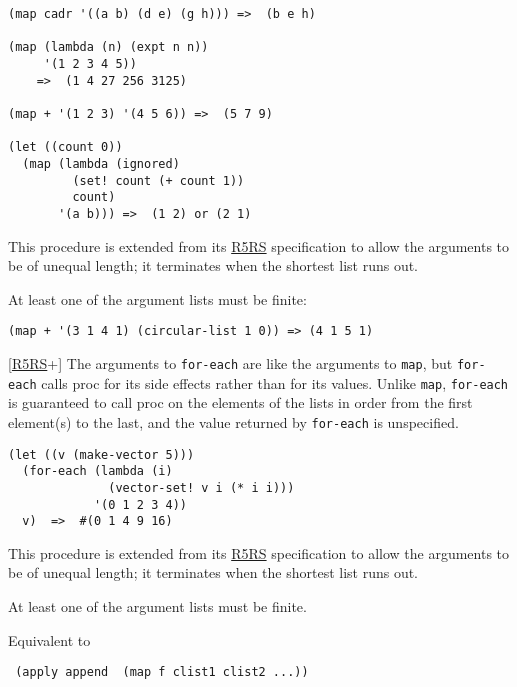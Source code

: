 \begin{description}
\begin{verbatim}
(map cadr '((a b) (d e) (g h))) =>  (b e h)

(map (lambda (n) (expt n n))
     '(1 2 3 4 5))
    =>  (1 4 27 256 3125)

(map + '(1 2 3) '(4 5 6)) =>  (5 7 9)

(let ((count 0))
  (map (lambda (ignored)
         (set! count (+ count 1))
         count)
       '(a b))) =>  (1 2) or (2 1)
\end{verbatim}

This procedure is extended from its \protect\hyperlink{R5RS}{R5RS}
specification to allow the arguments to be of unequal length; it
terminates when the shortest list runs out.

At least one of the argument lists must be finite:

\begin{verbatim}
(map + '(3 1 4 1) (circular-list 1 0)) => (4 1 5 1)
\end{verbatim}
\item[ \href{}{} \texttt{for-each} proc clist\textsubscript{1}
clist\textsubscript{2} \ldots{} -\textgreater{} unspecified ]
{[}\protect\hyperlink{R5RS}{R5RS}+{]} The arguments to \texttt{for-each}
are like the arguments to \texttt{map}, but \texttt{for-each} calls proc
for its side effects rather than for its values. Unlike \texttt{map},
\texttt{for-each} is guaranteed to call proc on the elements of the
lists in order from the first element(s) to the last, and the value
returned by \texttt{for-each} is unspecified.

\begin{verbatim}
(let ((v (make-vector 5)))
  (for-each (lambda (i)
              (vector-set! v i (* i i)))
            '(0 1 2 3 4))
  v)  =>  #(0 1 4 9 16)
\end{verbatim}

This procedure is extended from its \protect\hyperlink{R5RS}{R5RS}
specification to allow the arguments to be of unequal length; it
terminates when the shortest list runs out.

At least one of the argument lists must be finite.
\item[ \href{}{} \texttt{append-map~~}f clist\textsubscript{1}
clist\textsubscript{2} \ldots{} -\textgreater{} value\\
\href{}{} \texttt{append-map!~}f clist\textsubscript{1}
clist\textsubscript{2} \ldots{} -\textgreater{} value ]
Equivalent to

\texttt{\ (apply\ append\ \ (map\ f\ clist1\ clist2\ ...))}


\end{description}
